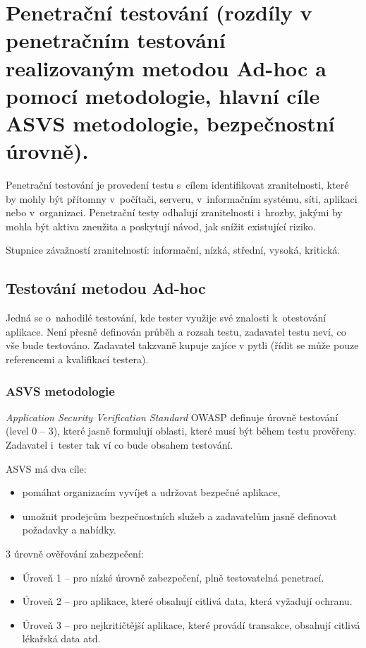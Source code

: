 \clearpage
\section{Penetrační testování (rozdíly v penetračním testování realizovaným metodou Ad-hoc a pomocí metodologie, hlavní cíle ASVS metodologie, bezpečnostní úrovně).}

Penetrační testování je provedení testu s~cílem identifikovat zranitelnosti, které by mohly být přítomny v~počítači, serveru, v~informačním systému, síti, aplikaci nebo v~organizaci.
Penetrační testy odhalují zranitelnosti i~hrozby, jakými by mohla být aktiva zneužita a poskytují návod, jak snížit existující riziko.

Stupnice závažností zranitelností: informační, nízká, střední, vysoká, kritická.


\subsection{Testování metodou Ad-hoc}

Jedná se o~nahodilé testování, kde tester využije své znalosti k~otestování aplikace.
Není přesně definován průběh a rozsah testu, zadavatel testu neví, co vše bude testováno.
Zadavatel takzvaně kupuje zajíce v pytli (řídit se může pouze referencemi a kvalifikací testera).


\subsubsection{ASVS metodologie}

\textit{Application Security Verification Standard} OWASP definuje úrovně testování (level 0 -- 3), které jasně formulují oblasti, které musí být během testu prověřeny.
Zadavatel i~tester tak ví co bude obsahem testování.

ASVS má dva cíle:
\begin{itemize}
    \item pomáhat organizacím vyvíjet a udržovat bezpečné aplikace,
    \item umožnit prodejcům bezpečnostních služeb a zadavatelům jasně definovat požadavky a nabídky.
\end{itemize}

3 úrovně ověřování zabezpečení:
\begin{itemize}
    \item Úroveň 1 -- pro nízké úrovně zabezpečení, plně testovatelná penetrací.
    \item Úroveň 2 -- pro aplikace, které obsahují citlivá data, která vyžadují ochranu.
    \item Úroveň 3 -- pro nejkritičtější aplikace, které provádí transakce, obsahují citlivá lékařská data atd.
\end{itemize}



